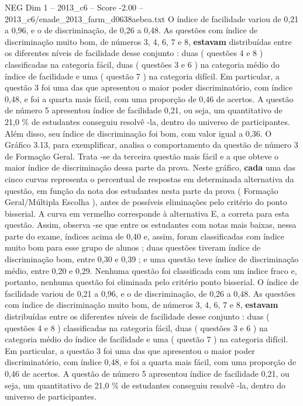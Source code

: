 \begin{textsample}{NEG Dim 1 – 2013\_c6 – Score -2.00 – 2013\_c6/enade\_2013\_farm\_d0638aebea.txt}
O índice de facilidade variou de 0,21 a 0,96, e o de discriminação, de 0,26 a 0,48.
As questões com índice de discriminação muito bom, de números 3, 4, 6, 7 e 8, \textbf{estavam} distribuídas entre os diferentes níveis de facilidade desse conjunto : duas ( questões 4 e 8 ) classificadas na categoria fácil, duas ( questões 3 e 6 ) na categoria médio do índice de facilidade e uma ( questão 7 ) na categoria difícil.
Em particular, a questão 3 foi uma das que apresentou o maior poder discriminatório, com índice 0,48, e foi a quarta mais fácil, com uma proporção de 0,46 de acertos.
A questão de número 5 apresentou índice de facilidade 0,21, ou seja, um quantitativo de 21,0 \% de estudantes conseguiu resolvê -la, dentro do universo de participantes.
Além disso, seu índice de discriminação foi bom, com valor igual a 0,36.
O Gráfico 3.13, para exemplificar, analisa o comportamento da questão de número 3 de Formação Geral.
Trata -se da terceira questão mais fácil e a que obteve o maior índice de discriminação dessa parte da prova.
Neste gráfico, \textbf{cada} uma das cinco curvas representa o percentual de respostas em determinada alternativa da questão, em função da nota dos estudantes nesta parte da prova ( Formação Geral/Múltipla Escolha ), antes de possíveis eliminações pelo critério do ponto bisserial.
A curva em vermelho corresponde à alternativa E, a correta para esta questão.
Assim, observa -se que entre os estudantes com notas mais baixas, nessa parte do exame, índices acima de 0,40 e, assim, foram classificadas com índice muito bom para esse grupo de alunos ; duas questões tiveram índice de discriminação bom, entre 0,30 e 0,39 ; e uma questão teve índice de discriminação médio, entre 0,20 e 0,29.
Nenhuma questão foi classificada com um índice fraco e, portanto, nenhuma questão foi eliminada pelo critério ponto bisserial.
O índice de facilidade variou de 0,21 a 0,96, e o de discriminação, de 0,26 a 0,48.
As questões com índice de discriminação muito bom, de números 3, 4, 6, 7 e 8, \textbf{estavam} distribuídas entre os diferentes níveis de facilidade desse conjunto : duas ( questões 4 e 8 ) classificadas na categoria fácil, duas ( questões 3 e 6 ) na categoria médio do índice de facilidade e uma ( questão 7 ) na categoria difícil.
Em particular, a questão 3 foi uma das que apresentou o maior poder discriminatório, com índice 0,48, e foi a quarta mais fácil, com uma proporção de 0,46 de acertos.
A questão de número 5 apresentou índice de facilidade 0,21, ou seja, um quantitativo de 21,0 \% de estudantes conseguiu resolvê -la, dentro do universo de participantes.

\end{textsample}
